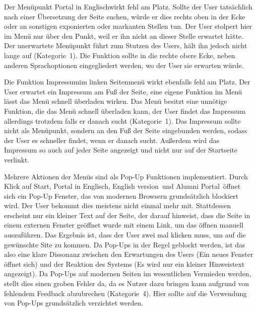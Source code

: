 {Der Menüpunkt \glqq Portal in Englisch\grqq wirkt fehl am Platz. Sollte der User tatsächlich nach einer Übersetzung der Seite suchen, würde er dies rechts oben in der Ecke oder an sonstigen exponierten oder markanten Stellen tun. 
Der User stolpert hier im Menü nur über den Punkt, weil er ihn nicht an dieser Stelle erwartet hätte.
}
{Der unerwartete Menüpunkt führt zum Stutzen des Users, hält ihn jedoch nicht lange auf (Kategorie~1).
}
{Die Funktion sollte in die rechte obere Ecke, neben anderen Sprachoptionen eingegliedert werden, wo der User sie erwarten würde.
}

{Die Funktion \glqq Impressum\grqq im linken Seitenmenü wirkt ebenfalls fehl am Platz. Der User erwartet ein Impressum am Fuß der Seite, eine eigene Funktion im Menü lässt das Menü schnell überladen wirken.
}
{Das Menü besitzt eine unnötige Funktion, die das Menü schnell überladen kann, der User findet das Impressum allerdings trotzdem falls er danach sucht (Kategorie~1).
}
{Das Impressum sollte nicht als Menüpunkt, sondern an den Fuß der Seite eingebunden werden, sodass der User es schneller findet, wenn er danach sucht. 
Außerdem wird das Impressum so auch auf jeder Seite angezeigt und nicht nur auf der Startseite verlinkt. 
}

{Mehrere Aktionen der Menüs sind als Pop-Up Funktionen implementiert. Durch Klick auf \glqq Start\grqq, \glqq Portal in Englisch\grqq, \glqq English version\grqq~und \glqq Alumni Portal\grqq~öffnet sich ein Pop-Up Fenster, das von modernen Browsern grundsätzlich blockiert wird. 
Der User bekommt dies meistens nicht einmal mehr mit. Stattdessen erscheint nur ein kleiner Text auf der Seite, der darauf hinweist, dass die Seite in einem externen Fenster geöffnet wurde mit einem Link, um das öffnen manuell auszuführen.
Das Ergebnis ist, dass der User zwei mal klicken muss, um auf die gewünschte Site zu kommen.
}
{Da Pop-Ups in der Regel geblockt werden, ist das also eine klare Dissonanz zwischen den Erwartungen des Users (Ein neues Fenster öffnet sich) und der Reaktion des Systems (Es wird nur ein kleiner Hinweistext angezeigt). Da Pop-Ups auf modernen Seiten im wesentlichen Vermieden werden, stellt dies einen groben Fehler da, da es Nutzer dazu bringen kann aufgrund von fehlendem Feedback abzubrechen (Kategorie~4).
}
{Hier sollte auf die Verwendung von Pop-Ups grundsätzlich verzichtet werden.
}

